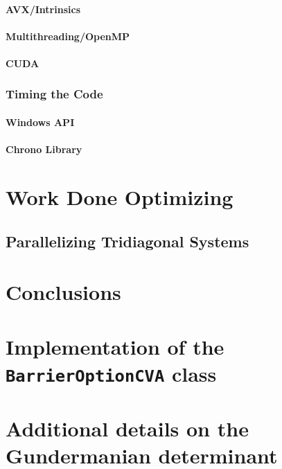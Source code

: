 \documentclass[12pt, oneside]{book}
\theoremstyle{plain}
\theoremstyle{definition}
\begin{document}
\subsubsection{AVX/Intrinsics}
\lipsum[5]
\subsubsection{Multithreading/OpenMP}
\lipsum[5]	
\subsubsection{CUDA}
\lipsum[5]	
\subsection{Timing the Code}
\subsubsection{Windows API}
\lipsum[5]
\subsubsection{Chrono Library}
\lipsum[5]

\chapter{Work Done Optimizing}

\section{Parallelizing Tridiagonal Systems}


\chapter{Conclusions}


\appendix
\chapter{Implementation of the {\tt BarrierOptionCVA} class}
\lipsum[100]
\chapter[shorter running title]{Additional details on the Gundermanian determinant}
\lipsum[100]
\end{document}
